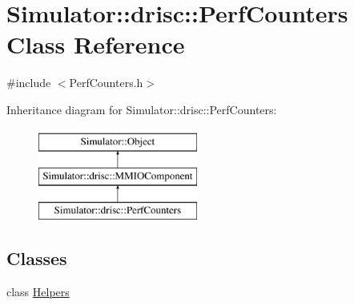 \hypertarget{class_simulator_1_1drisc_1_1_perf_counters}{\section{Simulator\+:\+:drisc\+:\+:Perf\+Counters Class Reference}
\label{class_simulator_1_1drisc_1_1_perf_counters}
}


{\ttfamily \#include $<$Perf\+Counters.\+h$>$}

Inheritance diagram for Simulator\+:\+:drisc\+:\+:Perf\+Counters\+:\begin{figure}[H]
\begin{center}
\leavevmode
\includegraphics[height=3.000000cm]{class_simulator_1_1drisc_1_1_perf_counters}
\end{center}
\end{figure}
\subsection*{Classes}
\begin{DoxyCompactItemize}
\item 
class \hyperlink{class_simulator_1_1drisc_1_1_perf_counters_1_1_helpers}{Helpers}
\end{DoxyCompactItemize}
